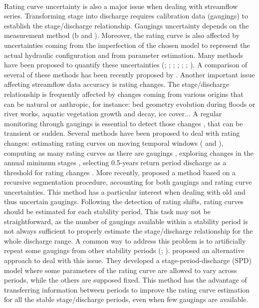 \documentclass[11pt]{article}
\begin{document}
    \paragraph{}
    Rating curve uncertainty is also a major issue when dealing with streamflow series. Transforming stage into discharge requires calibration data (gaugings) to establish the stage/discharge relationship. Gaugings uncertainty depends on the measurement method (\citet{lecoz_quantification_2014}b and \citet{puechberty_charte_2017}). Moreover, the rating curve is also affected by uncertainties coming from the imperfection of the chosen model to represent the actual hydraulic configuration and from parameter estimation. Many methods have been proposed to quantify these uncertainties (\citet{petersen-overleir_bayesian_2009}; \citet{juston_rating_2014}; \citet{le_coz_combining_2014}; \citet{morlot_dynamic_2014}; \citet{coxon_novel_2015}; \citet{mcmillan_rating_2015}; \citet{mansanarez_rapid_2019}). A comparison of several of these methods has been recently proposed by \citet{kiang_comparison_2018}. Another important issue affecting streamflow data accuracy is rating changes. The stage/discharge relationship is frequently affected by changes coming from various origins that can be natural or anthropic, for instance: bed geometry evolution during floods or river works, aquatic vegetation growth and decay, ice cover... A regular monitoring through gaugings is essential to detect those changes \citep{ibbitt_gauging_1987}, that can be transient or sudden. Several methods have been proposed to deal with rating changes: estimating rating curves on moving temporal windows (\citet{westerberg_stage-discharge_2011} and \citet{guerrero_temporal_2012}), computing as many rating curves as there are gaugings \citep{morlot_dynamic_2014}, exploring changes in the annual minimum stages \citep{lapuszek_methods_2015}, selecting 0.5-years return period discharge as a threshold for rating changes \citep{mcmillan_impacts_2010}. More recently, \citet{darienzo_detection_2021} proposed a method based on a recursive segmentation procedure, accounting for both gaugings and rating curve uncertainties. This method has a particular interest when dealing with old and thus uncertain gaugings. Following the detection of rating shifts, rating curves should be estimated for each stability period. This task may not be straightforward, as the number of gaugings available within a stability period is not always sufficient to properly estimate the stage/discharge relationship for the whole discharge range. A common way to address this problem is to artificially repeat some gaugings from other stability periods (\citet{mcmillan_benchmarking_2012}; \citet{puechberty_charte_2017}). \citet{mansanarez_shift_2019} proposed an alternative approach to deal with this issue. They developed a stage-period-discharge (SPD) model  where some parameters of the rating curve are allowed to vary across periods, while the others are supposed fixed. This method has the advantage of transferring information between periods to improve the rating curve estimation for all the stable stage/discharge periods, even when few gaugings are available.
\end{document}
